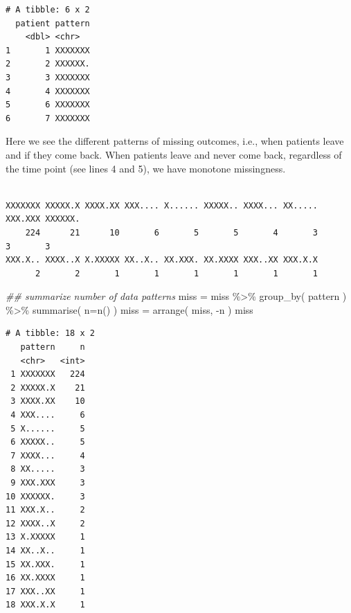 \documentclass[
  letterpaper,
  DIV=11,
  numbers=noendperiod]{scrreprt}
\newenvironment{Shaded}{\begin{snugshade}}{\end{snugshade}}
\newcommand{\AttributeTok}[1]{\textcolor[rgb]{0.49,0.56,0.16}{#1}}
\newcommand{\ConstantTok}[1]{\textcolor[rgb]{0.53,0.00,0.00}{#1}}
\newcommand{\DocumentationTok}[1]{\textcolor[rgb]{0.73,0.13,0.13}{\textit{#1}}}
\newcommand{\FunctionTok}[1]{\textcolor[rgb]{0.02,0.16,0.49}{#1}}
\newcommand{\NormalTok}[1]{\textcolor[rgb]{0.00,0.44,0.13}{#1}}
\newcommand{\OtherTok}[1]{\textcolor[rgb]{0.00,0.44,0.13}{#1}}
\newcommand{\SpecialCharTok}[1]{\textcolor[rgb]{0.25,0.44,0.63}{#1}}
\begin{document}
\begin{verbatim}
# A tibble: 6 x 2
  patient pattern
    <dbl> <chr>  
1       1 XXXXXXX
2       2 XXXXXX.
3       3 XXXXXXX
4       4 XXXXXXX
5       6 XXXXXXX
6       7 XXXXXXX
\end{verbatim}

Here we see the different patterns of missing outcomes, i.e., when
patients leave and if they come back. When patients leave and never come
back, regardless of the time point (see lines 4 and 5), we have monotone
missingness.

\begin{Shaded}
\end{Shaded}

\begin{verbatim}

XXXXXXX XXXXX.X XXXX.XX XXX.... X...... XXXXX.. XXXX... XX..... XXX.XXX XXXXXX. 
    224      21      10       6       5       5       4       3       3       3 
XXX.X.. XXXX..X X.XXXXX XX..X.. XX.XXX. XX.XXXX XXX..XX XXX.X.X 
      2       2       1       1       1       1       1       1 
\end{verbatim}

\begin{Shaded}
\begin{Highlighting}[]
\DocumentationTok{\#\# summarize number of data patterns }
\NormalTok{miss }\OtherTok{=}\NormalTok{ miss }\SpecialCharTok{\%\textgreater{}\%} \FunctionTok{group\_by}\NormalTok{( pattern ) }\SpecialCharTok{\%\textgreater{}\%}
    \FunctionTok{summarise}\NormalTok{( }\AttributeTok{n=}\FunctionTok{n}\NormalTok{() )}
\NormalTok{miss }\OtherTok{=} \FunctionTok{arrange}\NormalTok{( miss, }\SpecialCharTok{{-}}\NormalTok{n )}
\NormalTok{miss}
\end{Highlighting}
\end{Shaded}

\begin{verbatim}
# A tibble: 18 x 2
   pattern     n
   <chr>   <int>
 1 XXXXXXX   224
 2 XXXXX.X    21
 3 XXXX.XX    10
 4 XXX....     6
 5 X......     5
 6 XXXXX..     5
 7 XXXX...     4
 8 XX.....     3
 9 XXX.XXX     3
10 XXXXXX.     3
11 XXX.X..     2
12 XXXX..X     2
13 X.XXXXX     1
14 XX..X..     1
15 XX.XXX.     1
16 XX.XXXX     1
17 XXX..XX     1
18 XXX.X.X     1
\end{verbatim}
\end{document}
